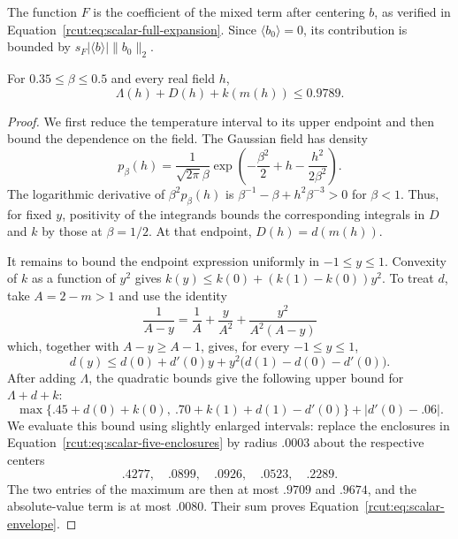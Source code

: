 The function \(F\) is the coefficient of the mixed term after centering
\(b\), as verified in Equation~\eqref{rcut:eq:scalar-full-expansion}.
Since \(\langle b_0\rangle=0\), its contribution is bounded by
\(s_F\lvert\langle b\rangle\rvert\|b_0\|_2\).

\begin{lemma}
\label{rcut:lem:scalar-envelope}
For \(0.35\leq\beta\leq0.5\) and every real field \(h\),
\begin{equation}
 \Lambda{}(h)+D(h)+k(m(h))\leq0.9789.
 \label{rcut:eq:scalar-envelope}
\end{equation}
\end{lemma}

\begin{proof}
We first reduce the temperature interval to its upper endpoint and then
bound the dependence on the field. The Gaussian field has density
\[
 p_\beta(h)=\frac1{\sqrt{2\pi}\beta}
   \exp\left(-\frac{\beta^2}{2}+h-\frac{h^2}{2\beta^2}\right).
\]
The logarithmic derivative of \(\beta^2p_\beta(h)\) is
\(\beta^{-1}-\beta+h^2\beta^{-3}>0\) for \(\beta<1\).
Thus, for fixed \(y\), positivity of the integrands bounds the
corresponding integrals in \(D\) and \(k\) by those at \(\beta=1/2\).
At that endpoint, \(D(h)=d(m(h))\).

It remains to bound the endpoint expression uniformly in
\(-1\leq y\leq1\). Convexity of \(k\) as a function of \(y^2\)
gives \(k(y)\leq k(0)+(k(1)-k(0))y^2\). To treat \(d\), take
\(A=2-m>1\) and use the identity
\[
 \frac1{A-y}=\frac1A+\frac{y}{A^2}
             +\frac{y^2}{A^2(A-y)}
\]
which, together with \(A-y\geq A-1\), gives, for every \(-1\leq y\leq1\),
\[
 d(y)\leq d(0)+d'(0)y+
               y^2\bigl(d(1)-d(0)-d'(0)\bigr).
\]
After adding \(\Lambda{}\), the quadratic bounds give the following
upper bound for \(\Lambda{}+d+k\):
\begin{equation}
 \max\{.45+d(0)+k(0),\ .70+k(1)+d(1)-d'(0)\}
       +|d'(0)-.06|.
 \label{rcut:eq:scalar-envelope-arithmetic}
\end{equation}
We evaluate this bound using slightly enlarged intervals: replace the
enclosures in Equation~\eqref{rcut:eq:scalar-five-enclosures} by radius
\(.0003\) about the respective centers
\[
 .4277,\quad .0899,\quad .0926,\quad .0523,\quad .2289.
\]
The two entries of the maximum are then at most \(.9709\) and
\(.9674\), and the absolute-value term is at most \(.0080\).
Their sum proves Equation~\eqref{rcut:eq:scalar-envelope}.
\end{proof}


